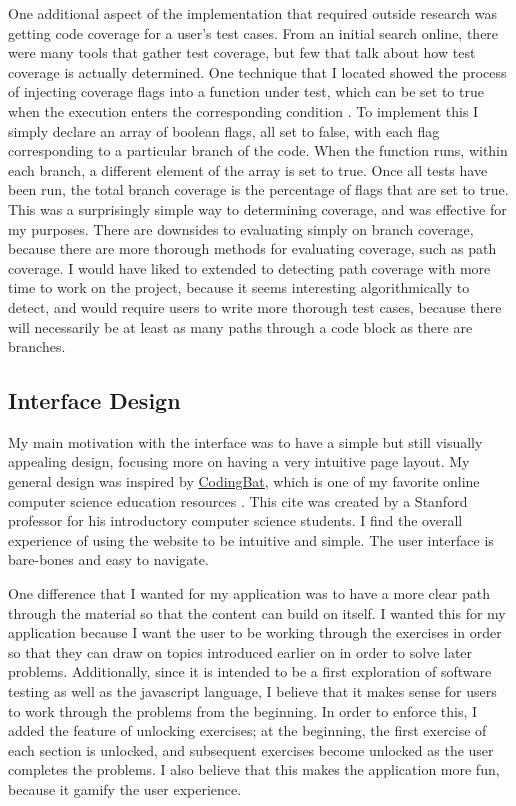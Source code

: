 \documentclass[10pt,twocolumn]{article}
\begin{document}
One additional aspect of the implementation that required outside research was getting code coverage for a user's test cases.
From an initial search online, there were many tools that gather test coverage, but few that talk about how test coverage 
is actually determined. One technique that I located showed the process of injecting coverage flags into a function under 
test, which can be set to true when the execution enters the corresponding condition \cite{coverage}. To implement this I
simply declare an array of boolean flags, all set to false, with each flag corresponding to a particular branch of the code. When the function runs,
within each branch, a different element of the array is set to true. Once all tests have been run, the total branch coverage 
is the percentage of flags that are set to true. This was a surprisingly simple way to determining coverage, and was effective 
for my purposes. There are downsides to evaluating simply on branch coverage, because there are more thorough methods for 
evaluating coverage, such as path coverage. I would have liked to extended to detecting path coverage with more time to 
work on the project, because it seems interesting algorithmically to detect, and would require users to write more thorough 
test cases, because there will necessarily be at least as many paths through a code block as there are branches. 


\subsection{Interface Design}

My main motivation with the interface was to have a simple but still visually appealing design, focusing more on having 
a very intuitive page layout. My general design was inspired by \href{https://codingbat.com/java}{CodingBat}, which is one 
of my favorite online computer science education resources \cite{CodingBat}. This cite was created by a Stanford professor 
for his introductory computer science students. I find the overall experience of using the 
website to be intuitive and simple. The user interface is bare-bones and easy to navigate.

One difference that I wanted for my application was to have a more clear path through the material so that the content can
build on itself. I wanted this for my application because I want the user to be working through the exercises in order so 
that they can draw on topics introduced earlier on in order to solve later problems. Additionally, since it is intended to 
be a first exploration of software testing as well as the javascript language, I believe that it makes sense for users to 
work through the problems from the beginning. In order to enforce this, I added the feature of unlocking exercises; at 
the beginning, the first exercise of each section is unlocked, and subsequent exercises become unlocked as the user 
completes the problems. I also believe that this makes the application more fun, because it gamify the user experience. 
\end{document}

